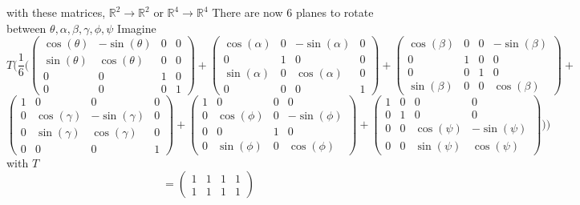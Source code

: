 \documentclass{article}
\begin{document}
with these matrices, $\mathbb{R}^{2}\to\mathbb{R}^2$ or $\mathbb{R}^{4}\to\mathbb{R}^4$
\newline There are now 6 planes to rotate between
\newline $\theta, \alpha, \beta, \gamma, \phi, \psi$
\newline Imagine
\[T(\frac{1}{6}(\begin{pmatrix}
    \cos(\theta) & -\sin(\theta) & 0 & 0 \\
    \sin(\theta) & \cos(\theta) & 0 & 0 \\
    0 & 0 & 1 & 0 \\
    0 & 0 & 0 & 1

\end{pmatrix}+
\begin{pmatrix}
    \cos(\alpha) & 0 & -\sin(\alpha) & 0 \\
    0 & 1 & 0 & 0 \\
    \sin(\alpha) & 0 & \cos(\alpha) & 0 \\
    0 & 0 & 0 & 1
\end{pmatrix}+
\begin{pmatrix}
    \cos(\beta) & 0 & 0 & -\sin(\beta)\\
    0 & 1 & 0 & 0 \\
    0 & 0 & 1 & 0 \\
    \sin(\beta) & 0 & 0 & \cos(\beta)
\end{pmatrix}+\]
\newline
\[\begin{pmatrix}
    1 & 0 & 0 & 0 \\
    0 & \cos(\gamma) & -\sin(\gamma) & 0 \\
    0 & \sin(\gamma) & \cos(\gamma) & 0 \\
    0 & 0 & 0 & 1
\end{pmatrix}+
\begin{pmatrix}
    1 & 0 & 0 & 0 \\
    0 & \cos(\phi) & 0 & -\sin(\phi) \\
    0 & 0 & 1 & 0 \\
    0 & \sin(\phi) & 0 & \cos(\phi)
\end{pmatrix}+
\begin{pmatrix}
    1 & 0 & 0 & 0 \\
    0 & 1 & 0 & 0 \\
    0 & 0 & \cos(\psi) & -\sin(\psi) \\
    0 & 0 & \sin(\psi) & \cos(\psi)
\end{pmatrix}
))\]
with $T$
\[=\begin{pmatrix}
    1 & 1 & 1 & 1 \\
    1 & 1 & 1 & 1
\end{pmatrix}\]
\end{document}
